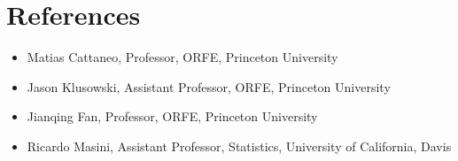 \documentclass{wgu-cv}
\begin{document}
\section{References}
\vspace{-0.22cm}

\begin{itemize}

  \item
    Matias Cattaneo,
    Professor,
    ORFE,
    Princeton University

  \item
    Jason Klusowski,
    Assistant Professor,
    ORFE,
    Princeton University

  \item
    Jianqing Fan,
    Professor,
    ORFE,
    Princeton University

  \item
    Ricardo Masini,
    Assistant Professor,
    Statistics,
    University of California, Davis

\end{itemize}
\end{document}
